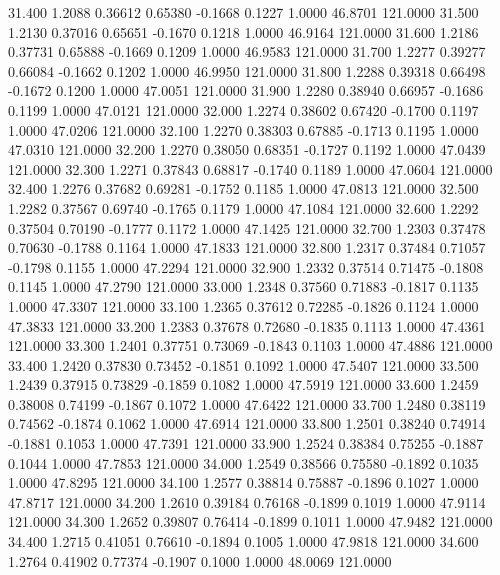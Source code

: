   31.400   1.2088   0.36612   0.65380  -0.1668   0.1227   1.0000  46.8701 121.0000
  31.500   1.2130   0.37016   0.65651  -0.1670   0.1218   1.0000  46.9164 121.0000
  31.600   1.2186   0.37731   0.65888  -0.1669   0.1209   1.0000  46.9583 121.0000
  31.700   1.2277   0.39277   0.66084  -0.1662   0.1202   1.0000  46.9950 121.0000
  31.800   1.2288   0.39318   0.66498  -0.1672   0.1200   1.0000  47.0051 121.0000
  31.900   1.2280   0.38940   0.66957  -0.1686   0.1199   1.0000  47.0121 121.0000
  32.000   1.2274   0.38602   0.67420  -0.1700   0.1197   1.0000  47.0206 121.0000
  32.100   1.2270   0.38303   0.67885  -0.1713   0.1195   1.0000  47.0310 121.0000
  32.200   1.2270   0.38050   0.68351  -0.1727   0.1192   1.0000  47.0439 121.0000
  32.300   1.2271   0.37843   0.68817  -0.1740   0.1189   1.0000  47.0604 121.0000
  32.400   1.2276   0.37682   0.69281  -0.1752   0.1185   1.0000  47.0813 121.0000
  32.500   1.2282   0.37567   0.69740  -0.1765   0.1179   1.0000  47.1084 121.0000
  32.600   1.2292   0.37504   0.70190  -0.1777   0.1172   1.0000  47.1425 121.0000
  32.700   1.2303   0.37478   0.70630  -0.1788   0.1164   1.0000  47.1833 121.0000
  32.800   1.2317   0.37484   0.71057  -0.1798   0.1155   1.0000  47.2294 121.0000
  32.900   1.2332   0.37514   0.71475  -0.1808   0.1145   1.0000  47.2790 121.0000
  33.000   1.2348   0.37560   0.71883  -0.1817   0.1135   1.0000  47.3307 121.0000
  33.100   1.2365   0.37612   0.72285  -0.1826   0.1124   1.0000  47.3833 121.0000
  33.200   1.2383   0.37678   0.72680  -0.1835   0.1113   1.0000  47.4361 121.0000
  33.300   1.2401   0.37751   0.73069  -0.1843   0.1103   1.0000  47.4886 121.0000
  33.400   1.2420   0.37830   0.73452  -0.1851   0.1092   1.0000  47.5407 121.0000
  33.500   1.2439   0.37915   0.73829  -0.1859   0.1082   1.0000  47.5919 121.0000
  33.600   1.2459   0.38008   0.74199  -0.1867   0.1072   1.0000  47.6422 121.0000
  33.700   1.2480   0.38119   0.74562  -0.1874   0.1062   1.0000  47.6914 121.0000
  33.800   1.2501   0.38240   0.74914  -0.1881   0.1053   1.0000  47.7391 121.0000
  33.900   1.2524   0.38384   0.75255  -0.1887   0.1044   1.0000  47.7853 121.0000
  34.000   1.2549   0.38566   0.75580  -0.1892   0.1035   1.0000  47.8295 121.0000
  34.100   1.2577   0.38814   0.75887  -0.1896   0.1027   1.0000  47.8717 121.0000
  34.200   1.2610   0.39184   0.76168  -0.1899   0.1019   1.0000  47.9114 121.0000
  34.300   1.2652   0.39807   0.76414  -0.1899   0.1011   1.0000  47.9482 121.0000
  34.400   1.2715   0.41051   0.76610  -0.1894   0.1005   1.0000  47.9818 121.0000
  34.600   1.2764   0.41902   0.77374  -0.1907   0.1000   1.0000  48.0069 121.0000
